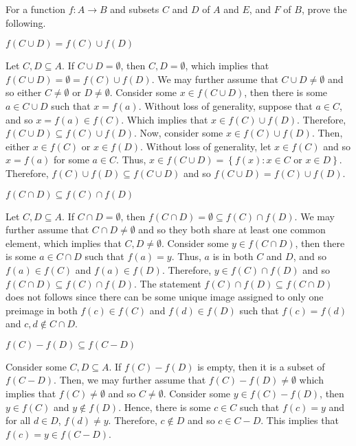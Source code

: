 \documentclass[12pt]{article}
\newenvironment{problem}[2][Problem]{\begin{trivlist} \item[\hskip \labelsep {\bfseries #1}\hskip \labelsep {\bfseries #2.}]}{\end{trivlist}}
\newenvironment{solution}[2][Solution]{\begin{trivlist} \item[\hskip \labelsep {\bfseries #1}\hskip \labelsep {\bfseries #2.}]}{\end{trivlist}}
\begin{document}
    \begin{problem}{12}
      For a function $f:A\to B$ and subsets $C$ and $D$ of $A$ and $E$, and $F$ of $B$, prove the following.
      \begin{enumerate}[label=(\alph*)]
	\item $f(C\cup D) = f(C)\cup f(D)$
	  \begin{solution}{(a)}
	    Let $C,D\subseteq A$. If $C\cup D = \emptyset$, then $C,D=\emptyset$, which implies that $f(C\cup D) = \emptyset = f(C)\cup f(D)$. We may further assume that $C\cup D\neq \emptyset$ and so either $C\neq \emptyset$ or $D\neq \emptyset$. Consider some $x\in f(C\cup D)$, then there is some $a\in C\cup D$ such that $x=f(a)$. Without loss of generality, suppose that $a\in C$, and so $x=f(a)\in f(C)$. Which implies that $x\in f(C)\cup f(D)$. Therefore, $f(C\cup D) \subseteq f(C)\cup f(D)$.
	    Now, consider some $x\in f(C)\cup f(D)$. Then, either $x\in f(C)$ or $x\in f(D)$. Without loss of generality, let $x\in f(C)$ and so $x=f(a)$ for some $a\in C$. Thus, $x\in f(C\cup D) =\left\{f(x):x\in C\text{ or }x\in D \right\}$. Therefore, $f(C)\cup f(D)\subseteq f(C\cup D)$ and so $f(C\cup D) = f(C)\cup f(D)$.
          \end{solution}
	\item $f(C\cap D) \subseteq f(C)\cap f(D)$
	  \begin{solution}{(b)}
	    Let $C,D\subseteq A$. If $C\cap D=\emptyset$, then $f(C\cap D) = \emptyset \subseteq f(C)\cap f(D)$. We may further assume that $C\cap D\neq \emptyset$ and so they both share at least one common element, which implies that $C,D\neq \emptyset$. Consider some $y\in f(C\cap D)$, then there is some $a\in C\cap D$ such that $f(a)=y$. Thus, $a$ is in both $C$ and $D$, and so $f(a)\in f(C)$ and $f(a)\in f(D)$. Therefore, $y\in f(C)\cap f(D)$ and so $f(C\cap D)\subseteq f(C)\cap f(D)$. 
	    The statement $f(C)\cap f(D)\subseteq f(C\cap D)$ does not follows since there can be some unique image assigned to only one preimage in both $f(c)\in f(C)$ and $f(d)\in f(D)$ such that $f(c) = f(d)$ and $c,d\not\in C\cap D$. 
    \end{solution}
	\item $f(C)-f(D) \subseteq f(C-D)$
	  \begin{solution}{(c)}
	    Consider some $C,D\subseteq A$. If $f(C)-f(D)$ is empty, then it is a subset of $f(C-D)$. Then, we may further assume that $f(C)-f(D)\neq \emptyset$ which implies that $f(C)\neq \emptyset$ and so $C\neq \emptyset$. Consider some $y\in f(C)-f(D)$, then $y\in f(C)$ and $y\not\in f(D)$. Hence, there is some $c\in C$ such that $f(c)=y$ and for all $d\in D$, $f(d)\neq y$. Therefore, $c\not\in D$ and so $c\in C-D$. This implies that $f(c)=y\in f(C-D)$. 

\end{solution}
\end{enumerate}
\end{problem}
\end{document}
